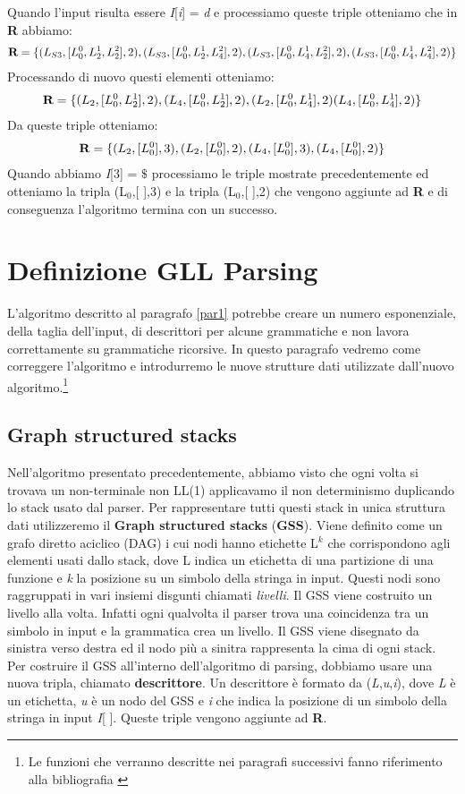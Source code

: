 Quando l'input risulta essere \textit{I}[\textit{i}] = \textit{d} e processiamo queste triple otteniamo che in \textbf{R} abbiamo:
\begin{align}
	\textbf{R} = \{ (L_{S3},[L_0^{0},L_2^{1},L_2^{2}],2), (L_{S3},[L_0^{0},L_2^{1},L_4^{2}],2),  (L_{S3},[L_0^{0},L_4^{1},L_2^{2}],2), (L_{S3},[L_0^{0},L_4^{1},L_4^{2}],2) \} \notag
\end{align}
Processando di nuovo questi elementi otteniamo:
\begin{align}
	\textbf{R} = \{ (L_{2},[L_0^{0},L_2^{1}],2), (L_{4},[L_0^{0},L_2^{1}],2), (L_{2},[L_0^{0},L_4^{1}],2) (L_{4},[L_0^{0},L_4^{1}],2) \} \notag
\end{align}
Da queste triple otteniamo:
\begin{align}
 	\textbf{R} = \{ (L_{2},[L_0^{0}],3), (L_{2},[L_0^{0}],2), (L_{4},[L_0^{0}],3), (L_{4},[L_0^{0}],2) \} \notag
\end{align}
Quando abbiamo \textit{I}[3] = $\$$ processiamo le triple mostrate precedentemente ed otteniamo la tripla (L$_{0}$,[ ],3) e la tripla (L$_{0}$,[ ],2) che vengono aggiunte ad \textbf{R} e di conseguenza l'algoritmo termina con un successo.
\section{Definizione GLL Parsing}
L'algoritmo descritto al paragrafo \ref{par1} potrebbe creare un numero esponenziale, della taglia dell'input, di descrittori per alcune grammatiche e non lavora correttamente su grammatiche ricorsive. In questo paragrafo vedremo come correggere l'algoritmo e introdurremo le nuove strutture dati utilizzate dall'nuovo algoritmo.\footnote{Le funzioni che verranno descritte nei paragrafi successivi fanno riferimento alla bibliografia \cite{pubblicazione: scott}}
\subsection{Graph structured stacks}
Nell'algoritmo presentato precedentemente, abbiamo visto che ogni volta si trovava un non-terminale non LL(1) applicavamo il non determinismo duplicando lo stack usato dal parser. Per rappresentare tutti questi stack in unica struttura dati utilizzeremo il \textbf{Graph structured stacks} (\textbf{GSS}). Viene definito \cite{tesi: lr} come un grafo diretto aciclico (DAG) i cui nodi hanno etichette L$^{k}$ che corrispondono agli elementi usati dallo stack, dove L indica un etichetta di una partizione di una funzione e \textit{k} la posizione su un simbolo della stringa in input. Questi nodi sono raggruppati in vari insiemi disgunti chiamati \textit{livelli}. Il GSS viene costruito un livello alla volta. Infatti ogni qualvolta il parser trova una coincidenza tra un simbolo in input e la grammatica crea un livello. Il GSS viene disegnato da sinistra verso destra ed il nodo più a sinitra rappresenta la cima di ogni stack. Per costruire il GSS all'interno dell'algoritmo di parsing, dobbiamo usare una nuova tripla, chiamato \textbf{descrittore}. Un descrittore è formato da (\textit{L},\textit{u},\textit{i}), dove \textit{L} è un etichetta, \textit{u} è un nodo del GSS e \textit{i} che indica la posizione di un simbolo della stringa in input \textit{I}[ ]. Queste triple vengono aggiunte ad \textbf{R}.
